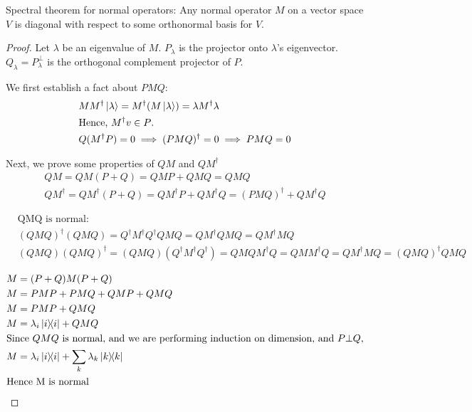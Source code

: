\begin{theorem}
Spectral theorem for normal operators:
Any normal operator $M$ on a vector space $V$ is diagonal with respect to some
orthonormal basis for $V$.
\end{theorem}
\begin{proof}
Let $\lambda$ be an eigenvalue of $M$. $P_\lambda$ is the projector onto
$\lambda$'s eigenvector. $Q_\lambda = P_\lambda^\bot$ is the orthogonal complement projector
of $P$.

We first establish a fact about $P M Q$:
\begin{align*}
&M M^\dagger \ket \lambda = M^\dagger (M \ket \lambda) = \lambda M^\dagger \lambda \\
&\text{Hence, $M^\dagger v \in P$.} \\
&Q (M^\dagger P) = 0 \implies (P M Q)^\dagger = 0 \implies P M Q = 0
\end{align*}

Next, we prove some properties of $QM$ and $QM^\dagger$
\begin{align*}
QM = QM(P + Q) = QMP + QMQ = QMQ \\
QM^\dagger = QM^\dagger(P + Q) = QM^\dagger P + QM^\dagger Q = (PMQ)^\dagger + QM^\dagger Q
\end{align*}

\begin{align*}
&\text{QMQ is normal:} \\
&(QMQ)^\dagger(QMQ) = Q^\dagger M^\dagger Q^\dagger Q M Q = Q M^\dagger Q M Q = Q M^\dagger M Q \\
&(QMQ)(QMQ)^\dagger = (Q M Q) (Q^\dagger M^\dagger Q^\dagger) = Q M Q M^\dagger Q = 
Q M M^\dagger Q = Q M^\dagger M Q = (QMQ)^\dagger QMQ
\end{align*}

\begin{align*}
&M = (P + Q) M (P + Q) \\
&M = P M P + P M Q + Q M P + Q M Q \\
&M = P M P + Q M Q \\
&M = \lambda_i \ketbra{i} + Q M Q \\
&\text{Since $Q M Q$ is normal, and we are performing induction on dimension, and $P \bot Q$,} \\
&M = \lambda_i \ketbra{i} + \sum_k \lambda_k \ketbra{k} \\
&\text{Hence M is normal}
\end{align*}
\end{proof}

